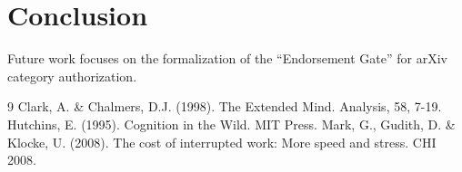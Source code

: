 \documentclass{article}
\begin{document}
\section{Conclusion}
Future work focuses on the formalization of the ``Endorsement Gate'' for arXiv category authorization.

\begin{thebibliography}{9}
 Clark, A. \& Chalmers, D.J. (1998). The Extended Mind. Analysis, 58, 7-19.
 Hutchins, E. (1995). Cognition in the Wild. MIT Press.
 Mark, G., Gudith, D. \& Klocke, U. (2008). The cost of interrupted work: More speed and stress. CHI 2008.
\end{thebibliography}
\end{document}
